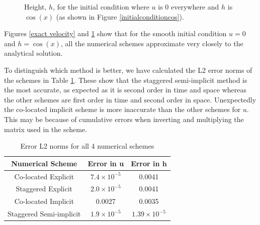 \documentclass[a4paper,12pt, notitlepage]{article}
\begin{document}
{\begin{figure} [H]
\begin{minipage}{.5\textwidth}
		\caption{\label{exact height} Height, $h$, for the initial condition where $u$ is 0 everywhere and $h$ is $\cos(x)$ (as shown in Figure \ref{initialconditioncos}).} 
	\end{minipage}
\end{figure}
Figures \ref{exact velocity} and \ref{exact height} show that for the smooth initial condition $u= 0$ and $h= \cos(x)$, all the numerical schemes approximate very closely to the analytical solution. 

To distinguish which method is better, we have calculated the L2 error norms of the schemes in Table \ref{errortable}. These show that the staggered semi-implicit method is the most accurate, as expected as it is second order in time and space whereas the other schemes are first order in time and second order in space. Unexpectedly the co-located implicit scheme is more inaccurate than the other schemes for $u$. This may be because of cumulative errors when inverting and multiplying the matrix used in the scheme.




\begin{table}[H]
	\centering
	\begin{tabular}{|c | c| c|} 
		\hline
		\textbf{Numerical Scheme} & \textbf{Error in u} & \textbf{Error in h}  \\
		\hline
		Co-located Explicit & $7.4 \times 10^{-5}$ & 0.0041\\ 
		\hline
		Staggered Explicit &  $2.0 \times 10^{-5}$ & 0.0041\\
		\hline
		Co-located  Implicit & 0.0027 & 0.0035 \\
		\hline
		Staggered Semi-implicit & $1.9 \times 10^{-5}$ & $1.39\times 10 ^{-5}$ \\
		\hline
	\end{tabular}
	\caption{Error L2 norms for all 4 numerical schemes}
	\label{errortable}
\end{table}

}
\end{document}
